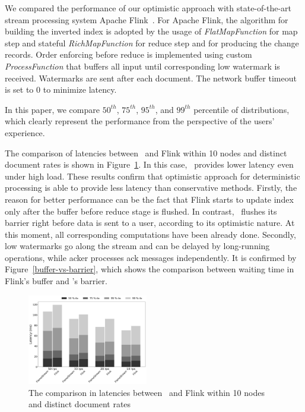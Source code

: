 We compared the performance of our optimistic approach with state-of-the-art stream processing system Apache Flink~\cite{carbone2015apache}. For Apache Flink, the algorithm for building the inverted index is adopted by the usage of {\it FlatMapFunction} for map step and stateful {\it RichMapFunction} for reduce step and for producing the change records. Order enforcing before reduce is implemented using custom {\it ProcessFunction} that buffers all input until corresponding low watermark is received. Watermarks are sent after each document. The network buffer timeout is set to 0 to minimize latency. 

In this paper, we compare $50^{th}$, $75^{th}$, $95^{th}$, and $99^{th}$ percentile of distributions, which clearly represent the performance from the perspective of the users' experience.

The comparison of latencies between \FlameStream\ and Flink within 10 nodes and distinct document rates is shown in Figure~\ref{fs-index-quantiles}. In this case, \FlameStream\ provides lower latency even under high load. These results confirm that optimistic approach for deterministic processing is able to provide less latency than conservative methods. Firstly, the reason for better performance can be the fact that Flink starts to update index only after the buffer before reduce stage is flushed. In contrast, \FlameStream\ flushes its barrier right before data is sent to a user, according to its optimistic nature. At this moment, all corresponding computations have been already done. Secondly, low watermarks go along the stream and can be delayed by long-running operations, while acker processes ack messages independently. It is confirmed by Figure~\ref{buffer-vs-barrier}, which shows the comparison between waiting time in Flink's buffer and \FlameStream's barrier.

\begin{figure}[htbp]
  \centering
  \includegraphics[width=0.47\textwidth]{pics/comp-index-quantiles}
  \caption{The comparison in latencies between \FlameStream\ and Flink within 10 nodes and distinct document rates}
  \label {fs-index-quantiles}
\end{figure}

